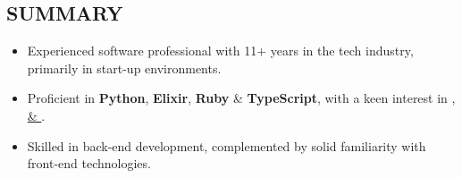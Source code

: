 \subsection*{SUMMARY}

\begin{itemize}[leftmargin=*,labelsep=1mm]
  \setlength{\parskip}{0mm}
  \setlength{\itemsep}{1mm}
  \item Experienced software professional with 11+ years in the tech industry, primarily in start-up environments.

  \item Proficient in \textbf{Python}, \textbf{Elixir}, \textbf{Ruby} \& \textbf{TypeScript},
  with a keen interest in \href{https://github.com/ethan605/aws-vpn-client}{},
  \href{https://xkpasswd.ethanify.me}{ \& }.

  \item Skilled in back-end development, complemented by solid familiarity with front-end technologies.
\end{itemize}
